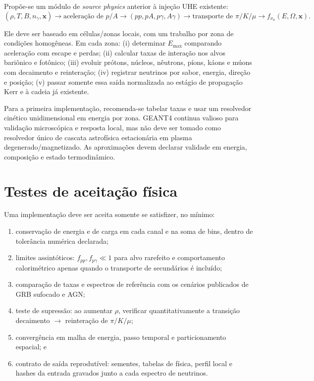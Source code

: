 \documentclass[11pt,a4paper]{article}
\begin{document}
Propõe-se um módulo de \emph{source physics} anterior à injeção UHE existente:
\[
 (\rho,T,B,n_\gamma,\mathbf{x})
 \rightarrow \text{aceleração de }p/A
 \rightarrow (pp,pA,p\gamma,A\gamma)
 \rightarrow \text{transporte de }\pi/K/\mu
 \rightarrow f_{\nu_\alpha}(E,\Omega,\mathbf{x}).
\]

Ele deve ser baseado em células/zonas locais, com um trabalho por zona de condições homogêneas. Em cada zona: (i) determinar $E_{\max}$ comparando aceleração com escape e perdas; (ii) calcular taxas de interação nos alvos bariônico e fotônico; (iii) evoluir prótons, núcleos, nêutrons, píons, káons e múons com decaimento e reinteração; (iv) registrar neutrinos por sabor, energia, direção e posição; (v) passar somente essa saída normalizada ao estágio de propagação Kerr e à cadeia já existente.

Para a primeira implementação, recomenda-se tabelar taxas e usar um resolvedor cinético unidimensional em energia por zona. GEANT4 continua valioso para validação microscópica e resposta local, mas não deve ser tomado como resolvedor único de cascata astrofísica estacionária em plasma degenerado/magnetizado. As aproximações devem declarar validade em energia, composição e estado termodinâmico.

\section{Testes de aceitação física}

Uma implementação deve ser aceita somente se satisfizer, no mínimo:
\begin{enumerate}
  \item conservação de energia e de carga em cada canal e na soma de bins, dentro de tolerância numérica declarada;
  \item limites assintóticos: $f_{pp},f_{p\gamma}\ll1$ para alvo rarefeito e comportamento calorimétrico apenas quando o transporte de secundários é incluído;
  \item comparação de taxas e espectros de referência com os cenários publicados de GRB sufocado e AGN;
  \item teste de supressão: ao aumentar $\rho$, verificar quantitativamente a transição decaimento $\rightarrow$ reinteração de $\pi/K/\mu$;
  \item convergência em malha de energia, passo temporal e particionamento espacial; e
  \item contrato de saída reprodutível: sementes, tabelas de física, perfil local e hashes da entrada gravados junto a cada espectro de neutrinos.
\end{enumerate}
\end{document}
